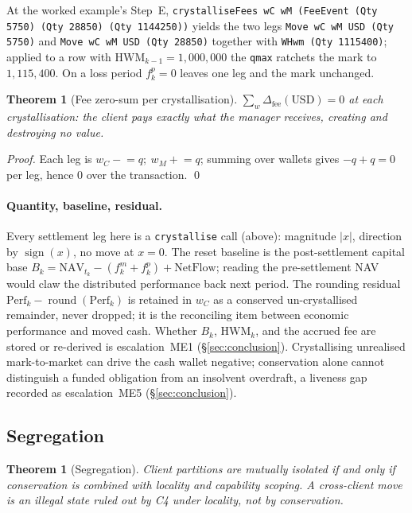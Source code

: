 \documentclass[11pt,a4paper]{article}
\newtheorem{theorem}[definition]{Theorem}
\begin{document}
\noindent At the worked example's Step~E,
\texttt{crystalliseFees wC wM (FeeEvent (Qty 5750) (Qty 28850) (Qty 1144250))} yields the
two legs \texttt{Move wC wM USD (Qty 5750)} and \texttt{Move wC wM USD (Qty 28850)} together
with \texttt{WHwm (Qty 1115400)}; applied to a row with $\mathrm{HWM}_{k-1}=1{,}000{,}000$ the
\texttt{qmax} ratchets the mark to $1{,}115{,}400$. On a loss period $f^p_k=0$ leaves one leg
and the mark unchanged.

\begin{theorem}[Fee zero-sum per crystallisation]
\label{thm:fee-zerosum}
$\sum_w \Delta_{\text{fee}}(\text{USD})=0$ at each crystallisation: the client pays exactly what
the manager receives, creating and destroying no value.
\end{theorem}
\noindent\textit{Proof.} Each leg is $w_C\mathbin{-}\!=q;\ w_M\mathbin{+}\!=q$; summing over
wallets gives $-q+q=0$ per leg, hence $0$ over the transaction. \qed

\paragraph{Quantity, baseline, residual.} Every settlement leg here is a \texttt{crystallise}
call (above): magnitude $|x|$, direction by $\operatorname{sign}(x)$, no move at $x=0$.
The reset baseline is the post-settlement capital base
$B_k=\mathrm{NAV}_{t_k}-(f^{m}_k+f^{p}_k)+\mathrm{NetFlow}$; reading the pre-settlement NAV would
claw the distributed performance back next period. The rounding residual
$\mathrm{Perf}_k-\operatorname{round}(\mathrm{Perf}_k)$ is retained in $w_C$ as a conserved
un-crystallised remainder, never dropped; it is the reconciling item between economic performance
and moved cash. Whether $B_k$, $\mathrm{HWM}_k$, and the accrued fee are stored or re-derived is
escalation~ME1 (\S\ref{sec:conclusion}). Crystallising unrealised mark-to-market can drive the cash
wallet negative; conservation alone cannot distinguish a funded obligation from an insolvent
overdraft, a liveness gap recorded as escalation~ME5 (\S\ref{sec:conclusion}).

\subsection{Segregation}
\label{sec:managed-segregation}

\begin{theorem}[Segregation]
\label{thm:seg}
Client partitions are mutually isolated if and only if conservation is combined with locality and
capability scoping. A cross-client move is an illegal state ruled out by C4 under locality, not by
conservation.
\end{theorem}
\end{document}
